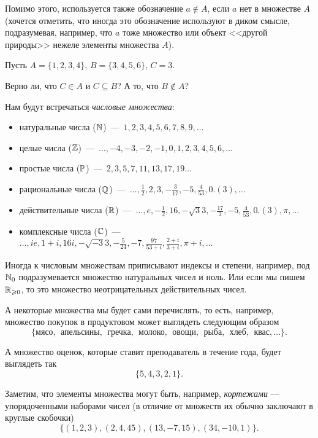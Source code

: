 	Помимо этого, используется также обозначение $a \notin A$, если $a$ нет в множестве $A$ 
	(хочется отметить, что иногда это обозначение используют в диком смысле, подразумевая, например,
	что $a$ тоже множество или объект <<другой природы>> нежеле элементы множества $A$).
	
\begin{testquestion}
	Пусть $A = \{ 1, 2, 3, 4\}$, $B = \{3, 4, 5, 6\}$, $C = 3$. 
	
	Верно ли, что $C \in A$ и $C \subseteq B$? А то, что $B \notin A$?
\end{testquestion}	

	Нам будут встречаться \emph{числовые множества}:
	
\begin{itemize}
	\item натуральные числа ($\mathbb{N}$)~---~$1, 2, 3, 4, 5, 6, 7, 8, 9, \dots$
	\item целые числа ($\mathbb{Z}$)~---~$\dots, -4, -3, -2, -1, 0, 1, 2, 3, 4, 5, 6, \dots$
	\item простые числа ($\mathbb{P}$)~---~$2, 3, 5, 7, 11, 13, 17, 19\dots$
	\item рациональные числа ($\mathbb{Q}$)~---~$\dots,\frac{1}{2}, 2, 3, -\frac{3}{17}, -5, \frac{4}{53}, 0.(3), \dots$
	\item действительные числа ($\mathbb{R}$)~---~$\dots,e, -\frac{1}{2}, 16, -\sqrt{3}3, -\frac{17}{3}, -5, \frac{4}{53}, 0.(3), \pi, \dots$
	\item комплексные числа ($\mathbb{C}$)~---~$\dots, ie, 1 + i, 16i, -\sqrt{-3}3, -\frac{5}{24}, -7, \frac{97}{53 + i}, \frac{2+i}{3+i}, \pi + i, \dots$
\end{itemize}
	
	Иногда к числовым множествам приписывают индексы и степени, например, под $\mathbb{N}_0$ подразумевается множество натуральных чисел и ноль. Или если мы пишем $\mathbb{R}_{\geqslant 0}$, то это множество неотрицательных действительных чисел.	
	
	А некоторые множества мы будет сами перечислять, то есть, например, множество покупок в продуктовом может выглядеть следующим образом
	$$\lbrace \text{мясо}, \:\ \text{апельсины}, \:\ \text{гречка}, \:\ \text{молоко}, 
	\:\ \text{овощи}, \:\ \text{рыба}, \:\ \text{хлеб}, \:\ \text{квас}, \dots \rbrace.$$
	
	А множество оценок, которые ставит преподаватель в течение года, будет выглядеть так
	$$\lbrace 5, 4, 3, 2, 1\rbrace.$$
	
	Заметим, что элементы множества могут быть, например, \emph{кортежами} --- упорядоченными наборами чисел (в отличие от множеств их обычно заключают в круглые скобочки)
	$$\{ (1, 2, 3), (2, 4, 45), (13, -7, 15), (34, -10, 1) \}.$$	
	
